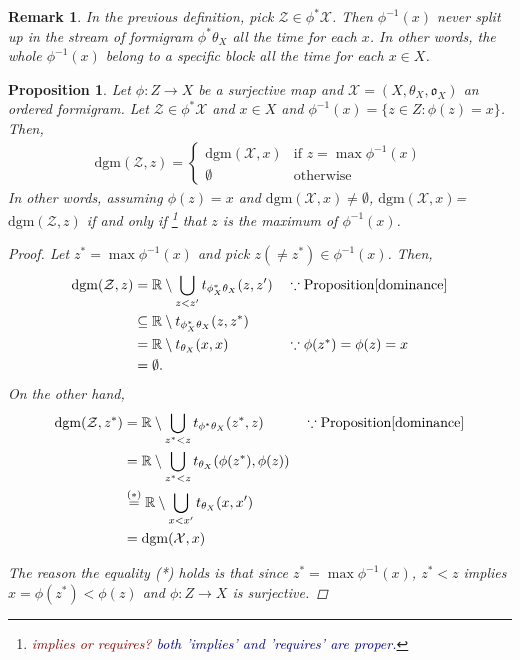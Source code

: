 \documentclass[a4paper,12pt]{article}
\newtheorem{remark}{Remark}[section]
\newtheorem{proposition}{Proposition}[section]
\newcommand{\woojin}[1]           {{ \textcolor{darkblue} {#1}}}
\newcommand{\facundo}[1]                {{ \textcolor{darkred} {#1}}}
\newcommand{\dgm}{\mathrm{dgm}}
\begin{document}
\begin{remark} In the previous definition, pick $\mathcal{Z}\in \phi^*\mathcal{X}$. Then $\phi^{-1}(x)$ never split up in the stream of formigram $\phi^*\theta_X$ all the time for each $x$. In other words, the whole $\phi^{-1}(x)$ belong to a specific block all the time for each $x\in X$. \label{split}

\end{remark}

\begin{proposition} \label{partialdgm} Let $\phi:Z\rightarrow X$ be a surjective map and $\mathcal{X} = (X,\theta_X, \mathfrak{o}_X)$ an ordered formigram. Let $\mathcal{Z}\in \phi^*\mathcal{X}$ and $x\in X$ and $\phi^{-1}(x)=\{z\in Z: \phi(z)=x\}$. Then,
\begin{align*}
\dgm(\mathcal{Z}, z)=\begin{cases} \dgm(\mathcal{X},x)&\mbox{if $z=\max \phi^{-1}(x)$}\\ \emptyset &\mbox{otherwise}
\end{cases}\end{align*}
In other words, assuming $\phi(z)=x$ and $\dgm(\mathcal{X},x)\neq \emptyset$,  $\dgm(\mathcal{X},x)$=$\dgm(\mathcal{Z},z)$ if and only if \footnote{\facundo{implies or requires?}\woojin{both 'implies' and 'requires' are proper.}} that $z$ is the maximum of $\phi^{-1}(x)$.

\begin{proof}Let $z^*=\max \phi^{-1}(x)$ and pick $z(\neq z^*)\in  \phi^{-1}(x)$. Then,
\begin{align*}
\dgm(\mathcal{Z},z)&=\mathbb{R}\setminus \bigcup_{z<z'} t_{\phi_X^*\theta_X}(z,z')&&\because \mbox{Proposition} \ref{dominance}
\\&\subseteq \mathbb{R}\setminus t_{\phi_X^*\theta_X}(z,z^*)
\\&= \mathbb{R} \setminus t_{\theta_X}(x,x) &&\because \mbox{$\phi(z^*)=\phi(z)=x$}
\\&=\emptyset. 
\end{align*} On the other hand, 
\begin{align*}
\dgm(\mathcal{Z},z^*)&=\mathbb{R}\setminus \bigcup_{z^*<z} t_{\phi^*\theta_X}(z^*,z)&&\because \mbox{Proposition}  \ref{dominance}
\\&=\mathbb{R}\setminus \bigcup_{z^*<z} t_{\theta_X}(\phi(z^*),\phi(z))
\\&\stackrel{(*)}{=}\mathbb{R}\setminus \bigcup_{x< x'} t_{\theta_X}(x,x')
\\&=\dgm(\mathcal{X},x)
\end{align*}

The reason the equality (*) holds is that since $z^*=\max{\phi^{-1}(x)}$,  $z^*<z$ implies $x=\phi(z^*)< \phi(z)$ and $\phi:Z\rightarrow X$ is surjective. 
\end{proof}

\end{proposition}
\end{document}
